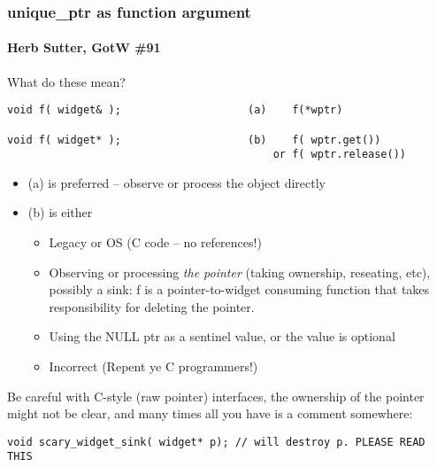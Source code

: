 \begin{frame}[fragile]
\frametitle{unique\_ptr as function argument}
\framesubtitle{Herb Sutter, GotW \#91}
What do these mean?
{\scriptsize\begin{verbatim}
void f( widget& );                    (a)    f(*wptr)

void f( widget* );                    (b)    f( wptr.get())
                                          or f( wptr.release())
\end{verbatim}}
\begin{itemize}
\pause{}
\item (a) is preferred -- observe or process the object directly
\pause{}
\item (b) is either
\begin{itemize}
  \item Legacy or OS (C code -- no references!)
  \item Observing or processing \emph{the pointer} (taking ownership,
    reseating, etc), possibly a sink: f is a pointer-to-widget consuming function that takes
  responsibility for deleting the pointer.
  \item Using the NULL ptr as a sentinel value, or the value is optional
  \item Incorrect (Repent ye C programmers!)
\end{itemize}
\end{itemize}
Be careful with C-style (raw pointer) interfaces, the ownership of the
pointer might not be clear, and many times all you have is a comment somewhere:
{\scriptsize\begin{verbatim}
void scary_widget_sink( widget* p); // will destroy p. PLEASE READ THIS
\end{verbatim}}
\end{frame}




